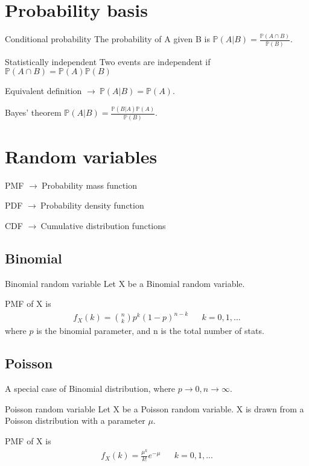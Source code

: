 \documentclass[10pt,a4paper]{article}
\numberwithin{equation}{section}
\newcommand{\prob}{\mathbb{P}}
\newcommand{\g}{$\rightarrow\ $}
\begin{document}
\clearpage



\section{Probability basis}

\begin{fact}{Conditional probability}{}
  The probability of A given B is $\prob(A|B) = \frac{\prob(A\cap B)}{\prob(B)}$.
\end{fact}

\begin{fact}{Statistically independent}{}
  Two events are independent if $\prob(A\cap B) = \prob(A)\prob(B)$
\end{fact}

Equivalent definition \g $\prob(A|B) = \prob(A)$.

\begin{fact}{Bayes’ theorem}{}
  $\prob(A|B) = \frac{\prob (B|A)\prob(A)}{\prob(B)}$.
\end{fact}

\section{Random variables}

PMF \g Probability mass function

PDF \g Probability density function

CDF \g Cumulative distribution functions

\subsection{Binomial}

\begin{fact}{Binomial random variable}{}
  Let X be a Binomial random variable.

  PMF of X is
  \begin{align}
    f_X(k) = \binom{n}{k}p^k(1-p)^{n-k} &&k=0,1,...
  \end{align}
  where $p$ is the binomial parameter, and n is the total number of stats.

\end{fact}

\subsection{Poisson}
A special case of Binomial distribution, where $p\rightarrow0,n\rightarrow\infty$.

\begin{fact}{Poisson random variable}{}
    Let X be a Poisson random variable.
    X is drawn from a Poisson distribution with a parameter $\mu$.

    PMF of X is
    \begin{align}
      f_X(k) =  \frac{\mu^k}{k!}e^{-\mu} && k = 0,1,...
    \end{align}
\end{fact}
\end{document}
